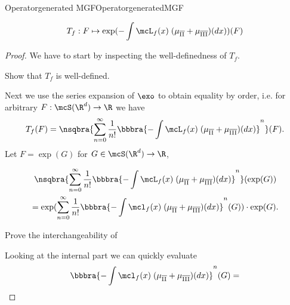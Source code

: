 \begin{mpos}{Operatorgenerated MGF}{OperatorgeneratedMGF}
                
    \[
        T_f:F\mapsto \exp(
            -\int\mcL_f(x)\;(\mu_{\overline{\text{II}}} + \mu_{\overline{\text{III}}})(dx)
        )(F)
    \]
\end{mpos}
\begin{proof}
    We have to start by inspecting the well-definedness of $T_f$.
    \begin{Aufgabe}
        \nr{} Show that $T_f$ is well-defined.
    \end{Aufgabe}
    Next we use the series expansion of $\exo$ to obtain equality by order, i.e. for arbitrary $F:\mcS(\R^d)\to\R$ we have
    \[
        T_f(F) = 
        \nsqbra{
            \sum_{n=0}^\infty\frac{1}{n!}\bbbra{-\int\mcL_f(x)\;(\mu_{\overline{\text{II}}} + \mu_{\overline{\text{III}}})(dx)}^n
        }(F).
    \]
    Let $F = \exp(G)$ for $G\in\mcS(\R^d)\to\R$, 

    \begin{multline*}
        \nsqbra{
            \sum_{n=0}^\infty\frac{1}{n!}\bbbra{-\int\mcL_f(x)\;(\mu_{\overline{\text{II}}} + \mu_{\overline{\text{III}}})(dx)}^n
        }(\exp(G)) \\
        = \exp(
            \sum_{n=0}^\infty\frac{1}{n!}\bbbra{-\int\mcl_f(x)\;(\mu_{\overline{\text{II}}} + \mu_{\overline{\text{III}}})(dx)}^n(G)
        )\cdot\exp(G).
    \end{multline*}
    \begin{Aufgabe}
        \nr{} Prove the interchangeability of 
    \end{Aufgabe}
    Looking at the internal part we can quickly evaluate
    \[
        \bbbra{-\int\mcl_f(x)\;(\mu_{\overline{\text{II}}} + \mu_{\overline{\text{III}}})(dx)}^n(G) = 
    \]
\end{proof}